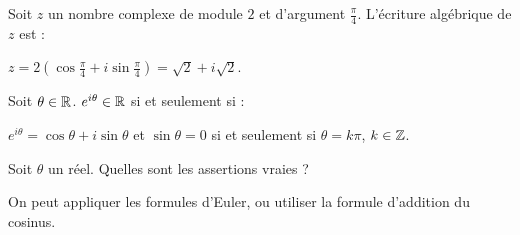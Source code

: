 \begin{question} 
Soit $z$ un nombre complexe de module $2$ et d'argument $\frac{\pi}{4}$. L'écriture algébrique de $z$ est : 
\begin{answers}



\end{answers}
\begin{explanations}
$z=2(\cos\frac{\pi}{4}+i\sin\frac{\pi}{4}) =\sqrt 2+i\sqrt 2 $.
\end{explanations}

\end{question}


\begin{question} 
Soit $\theta \in \mathbb{R}$. $e^{i\theta}\in \mathbb{R}$  si et seulement si : 
\begin{answers}

    \bad{ $\theta  =2\pi$}


\end{answers}
\begin{explanations}
$e^{i\theta}= \cos \theta + i \sin \theta $ et $\sin \theta = 0 $ si et seulement si $\theta  =k\pi$, $k \in \mathbb{Z}$.
\end{explanations}

\end{question}


\begin{question} 
Soit $\theta$ un réel.  Quelles sont les assertions vraies ?
\begin{answers}


\end{answers}
\begin{explanations}
On peut appliquer les formules d'Euler, ou utiliser la formule d'addition du cosinus. 

\end{explanations}

\end{question}


